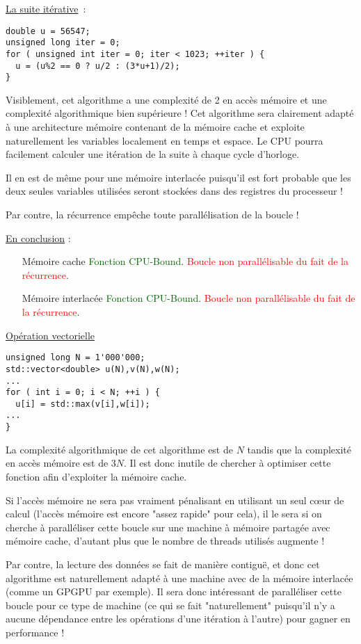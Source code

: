 \documentclass[fleqn,11pt]{article}
\begin{document}
\underline{La suite itérative}~:

\begin{lstlisting}
double u = 56547;
unsigned long iter = 0;
for ( unsigned int iter = 0; iter < 1023; ++iter ) {
  u = (u%2 == 0 ? u/2 : (3*u+1)/2);
}
\end{lstlisting}

Visiblement, cet algorithme a une complexité de 2 en accès mémoire et une complexité algorithmique bien supérieure ! Cet algorithme sera clairement adapté à une architecture mémoire contenant de la mémoire cache
et exploite naturellement les variables  localement en temps et espace. Le CPU pourra facilement calculer une itération de la suite à chaque cycle d'horloge. 

Il en est de même pour une mémoire interlacée puisqu'il est fort probable que les deux seules variables utilisées seront stockées dans des registres du processeur !

Par contre, la récurrence empêche toute parallélisation de la boucle !

\underline{En conclusion} :
\begin{itemize}
\item [Mémoire cache] \textcolor{darkgreen}{Fonction CPU-Bound}. \textcolor{red}{Boucle non parallélisable du fait de la récurrence}.
\item [Mémoire interlacée] \textcolor{darkgreen}{Fonction CPU-Bound}. \textcolor{red}{Boucle non parallélisable du fait de la récurrence}.
\end{itemize}

\underline{Opération vectorielle}

\begin{lstlisting}
unsigned long N = 1'000'000;
std::vector<double> u(N),v(N),w(N);
...
for ( int i = 0; i < N; ++i ) {
  u[i] = std::max(v[i],w[i]);
...
}
\end{lstlisting}

La complexité algorithmique de cet algorithme est de $N$ tandis que la complexité en accès mémoire
est de $3N$. Il est donc inutile de chercher à optimiser cette fonction afin d'exploiter la mémoire cache.

Si l'accès mémoire ne sera pas vraiment pénalisant en utilisant un seul c{\oe}ur de calcul (l'accès mémoire est encore "assez rapide" pour cela), il le sera si on cherche à paralléliser cette boucle sur une machine à mémoire partagée avec mémoire cache, d'autant plus que le nombre de threads utilisés augmente !

Par contre, la lecture des données se fait de manière contiguë, et donc cet algorithme est naturellement
adapté à une machine avec de la mémoire interlacée (comme un GPGPU par exemple). Il sera donc intéressant
de paralléliser cette boucle pour ce type de machine (ce qui se fait "naturellement" puisqu'il n'y a aucune
dépendance entre les opérations d'une itération à l'autre) pour gagner en performance !
\end{document}
